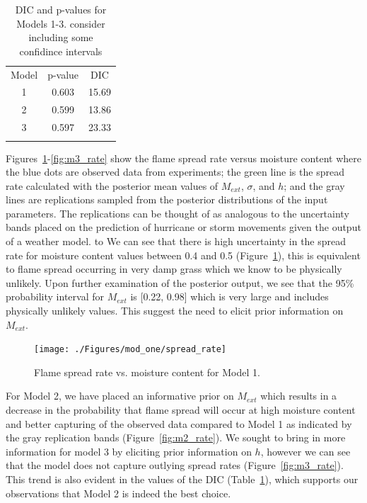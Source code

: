 \documentclass[11pt]{article}
\begin{document}
\begin{table}[h]
\caption{DIC and p-values for Models 1-3. consider including some confidince intervals}
\begin{center}
  \begin{tabular}{ccc}
    \hline\noalign{\smallskip}
    Model & p-value & DIC \\
    \noalign{\smallskip}\hline\noalign{\smallskip}
    1 & 0.603 & 15.69 \\
    2 & 0.599 & 13.86 \\ 
    3 & 0.597 & 23.33 \\ 
    \noalign{\smallskip}\hline
  \end{tabular}
\end{center}
\label{tab:dic}
\end{table}

Figures~\ref{fig:m1_rate}-\ref{fig:m3_rate} show the flame spread rate versus moisture content where the blue dots are observed data from experiments; the green line is the spread rate calculated with the posterior mean values of $M_{ext}$, $\sigma$, and $h$; and the gray lines are replications sampled from the posterior distributions of the input parameters. The replications can be thought of as analogous to the uncertainty bands placed on the prediction of hurricane or storm movements given the output of a weather model. to We can see that there is high uncertainty in the spread rate for moisture content values between 0.4 and 0.5 (Figure~\ref{fig:m1_rate}), this is equivalent to flame spread occurring in very damp grass which we know to be physically unlikely. Upon further examination of the posterior output, we see that the 95\% probability interval for $M_{ext}$ is [0.22, 0.98] which is very large and includes physically unlikely values. This suggest the need to elicit prior information on $M_{ext}$.

\begin{figure}[h]
\begin{center}
\texttt{[image: ./Figures/mod\_one/spread\_rate]}
\end{center}
\caption{Flame spread rate vs. moisture content for Model 1.}
\label{fig:m1_rate} 
\end{figure}

For Model 2, we have placed an informative prior on $M_{ext}$ which results in a decrease in the probability that flame spread will occur at high moisture content and better capturing of the observed data compared to Model 1 as indicated by the gray replication bands (Figure~\ref{fig:m2_rate}). We sought to bring in more information for model 3 by eliciting prior information on $h$, however we can see that the model does not capture outlying spread rates (Figure~\ref{fig:m3_rate}). This trend is also evident in the values of the DIC (Table~\ref{tab:dic}), which supports our observations that Model 2 is indeed the best choice. 
\end{document}
